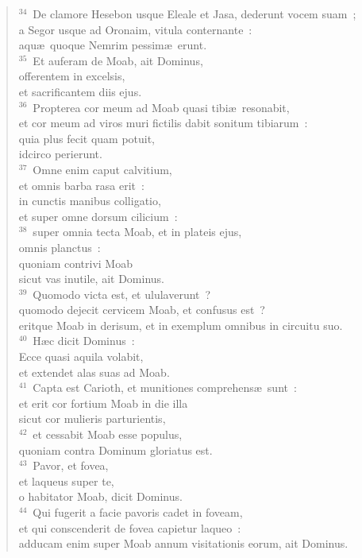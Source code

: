 \begin{flushleft}
\begin{verse}
${}^{34}$~De clamore Hesebon usque Eleale et Jasa, dederunt vocem suam~;\\ a Segor usque ad Oronaim, vitula conternante~:\\ aqu\ae\ quoque Nemrim pessim\ae\ erunt.\\
${}^{35}$~Et auferam de Moab, ait Dominus,\\ offerentem in excelsis,\\ et sacrificantem diis ejus.\\
${}^{36}$~Propterea cor meum ad Moab quasi tibi\ae\ resonabit,\\ et cor meum ad viros muri fictilis dabit sonitum tibiarum~:\\ quia plus fecit quam potuit,\\ idcirco perierunt.\\
${}^{37}$~Omne enim caput calvitium,\\ et omnis barba rasa erit~:\\ in cunctis manibus colligatio,\\ et super omne dorsum cilicium~:\\
${}^{38}$~super omnia tecta Moab, et in plateis ejus,\\ omnis planctus~:\\ quoniam contrivi Moab\\ sicut vas inutile, ait Dominus.\\
${}^{39}$~Quomodo victa est, et ululaverunt~?\\ quomodo dejecit cervicem Moab, et confusus est~?\\ eritque Moab in derisum, et in exemplum omnibus in circuitu suo.\\
${}^{40}$~H\ae c dicit Dominus~:\\ Ecce quasi aquila volabit,\\ et extendet alas suas ad Moab.\\
${}^{41}$~Capta est Carioth, et munitiones comprehens\ae\ sunt~:\\ et erit cor fortium Moab in die illa\\ sicut cor mulieris parturientis,\\
${}^{42}$~et cessabit Moab esse populus,\\ quoniam contra Dominum gloriatus est.\\
${}^{43}$~Pavor, et fovea,\\ et laqueus super te,\\ o habitator Moab, dicit Dominus.\\
${}^{44}$~Qui fugerit a facie pavoris cadet in foveam,\\ et qui conscenderit de fovea capietur laqueo~:\\ adducam enim super Moab annum visitationis eorum, ait Dominus.\\

\end{verse}
\end{flushleft}
